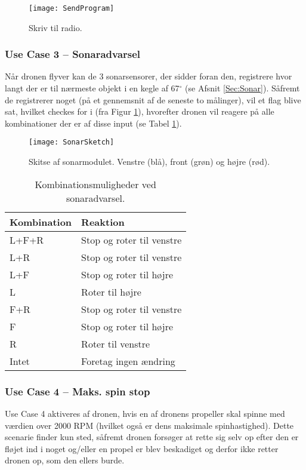 \documentclass[Main]{subfiles}
\begin{document}
\begin{figure}[H]
\centering
\texttt{[image: SendProgram]}
\caption{Skriv til radio.}
\label{Fig:SendProgram}
\end{figure}


\newpage
\subsubsection{Use Case 3 -- Sonaradvarsel}
Når dronen flyver kan de 3 sonarsensorer, der sidder foran den, registrere hvor langt der er til nærmeste objekt i en kegle af 67$^{\circ}$ (se Afsnit \ref{Sec:Sonar}).
Såfremt de registrerer noget (på et gennemsnit af de seneste to målinger), vil et flag blive sat, hvilket checkes for i  (fra Figur \ref{Fig:SendProgram}), hvorefter dronen vil reagere på alle kombinationer der er af disse input (se Tabel \ref{Tab:SonarAdvarsel}).


\begin{figure}[H]
\centering
\texttt{[image: SonarSketch]}
\caption{Skitse af sonarmodulet. Venstre (blå), front (grøn) og højre (rød).}
\label{Fig:SonarSketch}
\end{figure}

\begin{table}[H]
\centering
	\begin{tabular}{l l}
	\hline Kombination & Reaktion
	\\ \hline 
	L+F+R & Stop og roter til venstre \\
	L+R & Stop og roter til venstre\\
	L+F & Stop og roter til højre\\
	L & Roter til højre\\
	F+R & Stop og roter til venstre\\
	F & Stop og roter til højre\\
	R & Roter til venstre\\
	Intet & Foretag ingen ændring \\ \hline
	\end{tabular}
\caption{Kombinationsmuligheder ved sonaradvarsel.}
\label{Tab:SonarAdvarsel}
\end{table}

\newpage
\subsubsection{Use Case 4 -- Maks. spin stop}
Use Case 4 aktiveres af dronen, hvis en af dronens propeller skal spinne med værdien over 2000 RPM (hvilket også er dens maksimale spinhastighed).
Dette scenarie finder kun sted, såfremt dronen forsøger at rette sig selv op efter den er fløjet ind i noget og/eller en propel er blev beskadiget og derfor ikke retter dronen op, som den ellers burde.
\end{document}
